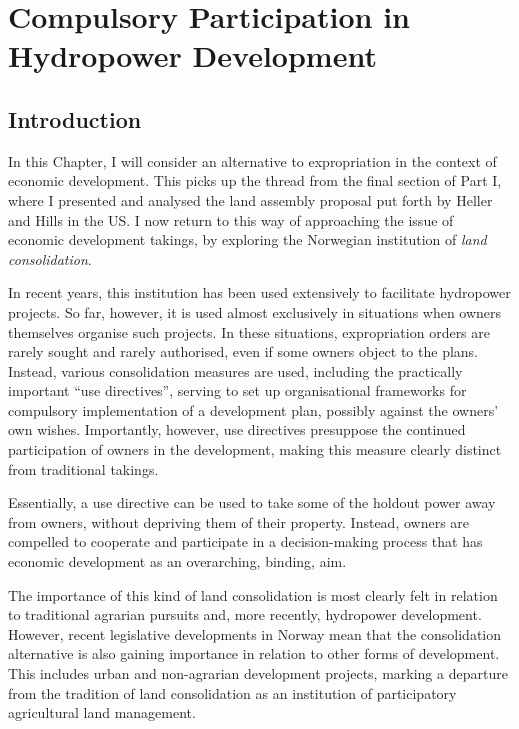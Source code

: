 \chapter{Compulsory Participation in Hydropower Development}\label{chap:6}

\section{Introduction}\label{sec:intro6}

In this Chapter, I will consider an alternative to expropriation in the context of economic development. This picks up the thread from the final section of Part I, where I presented and analysed the land assembly proposal put forth by Heller and Hills in the US. I now return to this way of approaching the issue of economic development takings, by exploring the Norwegian institution of {\it land consolidation}.

In recent years, this institution has been used extensively to facilitate hydropower projects. So far, however, it is used almost exclusively in situations when owners themselves organise such projects. In these situations, expropriation orders are rarely sought and rarely authorised, even if some owners object to the plans. Instead, various consolidation measures are used, including the practically important ``use directives'', serving to set up organisational frameworks for compulsory implementation of a development plan, possibly against the owners' own wishes. Importantly, however, use directives presuppose the continued participation of owners in the development, making this measure clearly distinct from traditional takings.

Essentially, a use directive can be used to take some of the holdout power away from owners, without depriving them of their property. Instead, owners are compelled to cooperate and participate in a decision-making process that has economic development as an overarching, binding, aim.

The importance of this kind of land consolidation is most clearly felt in relation to traditional agrarian pursuits and,  more recently, hydropower development. However, recent legislative developments in Norway mean that the consolidation alternative is also gaining importance in relation to other forms of development. This includes urban and non-agrarian development projects, marking a departure from the tradition of land consolidation as an institution of participatory agricultural land management. 


